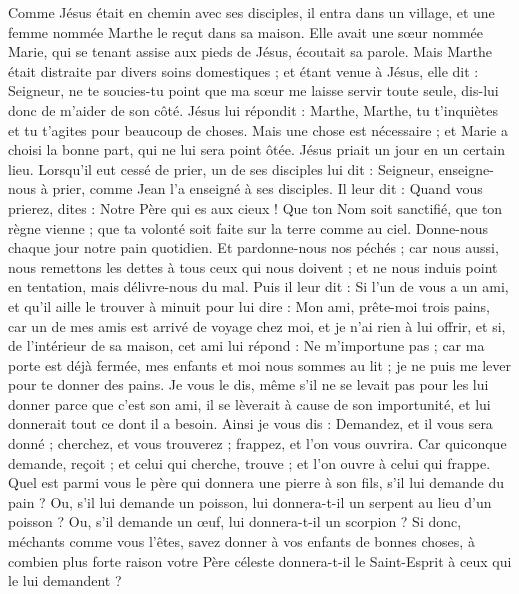 \begin{multicols}{2}
Comme Jésus était en chemin avec ses disciples, il entra dans un village, et une femme nommée Marthe le reçut dans sa maison.
Elle avait une sœur nommée Marie, qui se tenant assise aux pieds de Jésus, écoutait sa parole.
Mais Marthe était distraite par divers soins domestiques ; et étant venue à Jésus, elle dit : Seigneur, ne te soucies-tu point que ma sœur me laisse servir toute seule, dis-lui donc de m’aider de son côté.
Jésus lui répondit : Marthe, Marthe, tu t'inquiètes et tu t'agites pour beaucoup de choses.
Mais une chose est nécessaire ; et Marie a choisi la bonne part, qui ne lui sera point ôtée.
\VerseOne{}Jésus priait un jour en un certain lieu. Lorsqu’il eut cessé de prier, un de ses disciples lui dit : Seigneur, enseigne-nous à prier, comme Jean l’a enseigné à ses disciples.
Il leur dit : Quand vous prierez, dites : Notre Père qui es aux cieux ! Que ton Nom soit sanctifié, que ton règne vienne ; que ta volonté soit faite sur la terre comme au ciel.
Donne-nous chaque jour notre pain quotidien.
Et pardonne-nous nos péchés ; car nous aussi, nous remettons les dettes à tous ceux qui nous doivent ; et ne nous induis point en tentation, mais délivre-nous du mal.
Puis il leur dit : Si l’un de vous a un ami, et qu’il aille le trouver à minuit pour lui dire : Mon ami, prête-moi trois pains,
car un de mes amis est arrivé de voyage chez moi, et je n’ai rien à lui offrir,
et si, de l’intérieur de sa maison, cet ami lui répond : Ne m'importune pas ; car ma porte est déjà fermée, mes enfants et moi nous sommes au lit ; je ne puis me lever pour te donner des pains.
Je vous le dis, même s’il ne se levait pas pour les lui donner parce que c’est son ami, il se lèverait à cause de son importunité, et lui donnerait tout ce dont il a besoin.
Ainsi je vous dis : Demandez, et il vous sera donné ; cherchez, et vous trouverez ; frappez, et l’on vous ouvrira.
Car quiconque demande, reçoit ; et celui qui cherche, trouve ; et l’on ouvre à celui qui frappe.
Quel est parmi vous le père qui donnera une pierre à son fils, s’il lui demande du pain ? Ou, s’il lui demande un poisson, lui donnera-t-il un serpent au lieu d’un poisson ?
Ou, s'il demande un œuf, lui donnera-t-il un scorpion ?
Si donc, méchants comme vous l’êtes, savez donner à vos enfants de bonnes choses, à combien plus forte raison votre Père céleste donnera-t-il le Saint-Esprit à ceux qui le lui demandent ?

\end{multicols}
